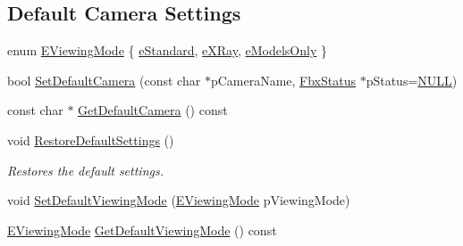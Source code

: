 \subsection*{Default Camera Settings}
\begin{DoxyCompactItemize}
\item 
enum \hyperlink{class_fbx_global_camera_settings_aaa674f8b39e4cd57d7cc07f381f11858}{E\+Viewing\+Mode} \{ \hyperlink{class_fbx_global_camera_settings_aaa674f8b39e4cd57d7cc07f381f11858a0336e82bb15b3eac5b9b60501aa3cb45}{e\+Standard}, 
\hyperlink{class_fbx_global_camera_settings_aaa674f8b39e4cd57d7cc07f381f11858adecac3c5b557d7f8c27d88ee72ca48ab}{e\+X\+Ray}, 
\hyperlink{class_fbx_global_camera_settings_aaa674f8b39e4cd57d7cc07f381f11858a30be58e2817cc1fd6e68574cb6ba27f1}{e\+Models\+Only}
 \}
\item 
bool \hyperlink{class_fbx_global_camera_settings_a6069976325cb9983f6ed75e1884f1981}{Set\+Default\+Camera} (const char $\ast$p\+Camera\+Name, \hyperlink{class_fbx_status}{Fbx\+Status} $\ast$p\+Status=\hyperlink{fbxarch_8h_a070d2ce7b6bb7e5c05602aa8c308d0c4}{N\+U\+LL})
\item 
const char $\ast$ \hyperlink{class_fbx_global_camera_settings_ab2f43528a6d09862bc735d7695af9868}{Get\+Default\+Camera} () const
\item 
void \hyperlink{class_fbx_global_camera_settings_a1024ebc19b9641163a74a4cc457f8c0d}{Restore\+Default\+Settings} ()
\begin{DoxyCompactList}\small\item\em Restores the default settings. \end{DoxyCompactList}\item 
void \hyperlink{class_fbx_global_camera_settings_a15790cd057733254a0e82b172b644122}{Set\+Default\+Viewing\+Mode} (\hyperlink{class_fbx_global_camera_settings_aaa674f8b39e4cd57d7cc07f381f11858}{E\+Viewing\+Mode} p\+Viewing\+Mode)
\item 
\hyperlink{class_fbx_global_camera_settings_aaa674f8b39e4cd57d7cc07f381f11858}{E\+Viewing\+Mode} \hyperlink{class_fbx_global_camera_settings_a458ad62da44fe9f580550162832edbb9}{Get\+Default\+Viewing\+Mode} () const
\end{DoxyCompactItemize}
